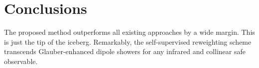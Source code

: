 \section{Conclusions}\label{sec:conclusions}

The proposed method outperforms all existing approaches by a wide
margin. This is just the tip of the iceberg. Remarkably, the
self-supervised reweighting scheme transcends Glauber-enhanced dipole
showers for any infrared and collinear safe observable.

